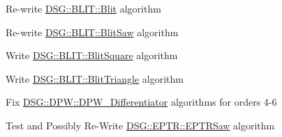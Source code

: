 
\begin{DoxyRefList}
\item[\label{todo__todo000001}%
\hypertarget{todo__todo000001}{}%
Class \hyperlink{class_d_s_g_1_1_b_l_i_t_1_1_blit}{D\+S\+G\+:\+:B\+L\+I\+T\+:\+:Blit} ]Re-\/write \hyperlink{class_d_s_g_1_1_b_l_i_t_1_1_blit}{D\+S\+G\+::\+B\+L\+I\+T\+::\+Blit} algorithm  
\item[\label{todo__todo000002}%
\hypertarget{todo__todo000002}{}%
Class \hyperlink{class_d_s_g_1_1_b_l_i_t_1_1_blit_saw}{D\+S\+G\+:\+:B\+L\+I\+T\+:\+:Blit\+Saw} ]Re-\/write \hyperlink{class_d_s_g_1_1_b_l_i_t_1_1_blit_saw}{D\+S\+G\+::\+B\+L\+I\+T\+::\+Blit\+Saw} algorithm  
\item[\label{todo__todo000003}%
\hypertarget{todo__todo000003}{}%
Class \hyperlink{class_d_s_g_1_1_b_l_i_t_1_1_blit_square}{D\+S\+G\+:\+:B\+L\+I\+T\+:\+:Blit\+Square} ]Write \hyperlink{class_d_s_g_1_1_b_l_i_t_1_1_blit_square}{D\+S\+G\+::\+B\+L\+I\+T\+::\+Blit\+Square} algorithm  
\item[\label{todo__todo000004}%
\hypertarget{todo__todo000004}{}%
Class \hyperlink{class_d_s_g_1_1_b_l_i_t_1_1_blit_triangle}{D\+S\+G\+:\+:B\+L\+I\+T\+:\+:Blit\+Triangle} ]Write \hyperlink{class_d_s_g_1_1_b_l_i_t_1_1_blit_triangle}{D\+S\+G\+::\+B\+L\+I\+T\+::\+Blit\+Triangle} algorithm  
\item[\label{todo__todo000005}%
\hypertarget{todo__todo000005}{}%
Class \hyperlink{class_d_s_g_1_1_d_p_w_1_1_d_p_w___differentiator}{D\+S\+G\+:\+:D\+P\+W\+:\+:D\+P\+W\+\_\+\+Differentiator$<$ order $>$} ]Fix \hyperlink{class_d_s_g_1_1_d_p_w_1_1_d_p_w___differentiator}{D\+S\+G\+::\+D\+P\+W\+::\+D\+P\+W\+\_\+\+Differentiator} algorithms for orders 4-\/6  
\item[\label{todo__todo000006}%
\hypertarget{todo__todo000006}{}%
Class \hyperlink{class_d_s_g_1_1_e_p_t_r_1_1_e_p_t_r_saw}{D\+S\+G\+:\+:E\+P\+T\+R\+:\+:E\+P\+T\+R\+Saw} ]Test and Possibly Re-\/\+Write \hyperlink{class_d_s_g_1_1_e_p_t_r_1_1_e_p_t_r_saw}{D\+S\+G\+::\+E\+P\+T\+R\+::\+E\+P\+T\+R\+Saw} algorithm 
\end{DoxyRefList}
